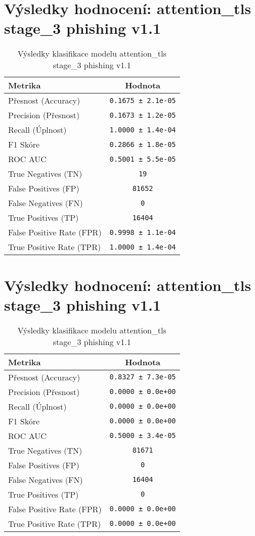 \section*{Výsledky hodnocení: attention_tls stage_3 phishing v1.1}
\begin{table}[h!]
\centering
\begin{tabular}{|l|c|}
\hline
\textbf{Metrika} & \textbf{Hodnota} \\
\hline
Přesnost (Accuracy) & \texttt{0.1675 ± 2.1e-05} \\
Precision (Přesnost) & \texttt{0.1673 ± 1.2e-05} \\
Recall (Úplnost) & \texttt{1.0000 ± 1.4e-04} \\
F1 Skóre & \texttt{0.2866 ± 1.8e-05} \\
ROC AUC & \texttt{0.5001 ± 5.5e-05} \\
True Negatives (TN) & \texttt{19} \\
False Positives (FP) & \texttt{81652} \\
False Negatives (FN) & \texttt{0} \\
True Positives (TP) & \texttt{16404} \\
False Positive Rate (FPR) & \texttt{0.9998 ± 1.1e-04} \\
True Positive Rate (TPR) & \texttt{1.0000 ± 1.4e-04} \\
\hline
\end{tabular}
\caption{Výsledky klasifikace modelu attention_tls stage_3 phishing v1.1}
\label{tab:phishing_attention_tls}
\end{table}

\section*{Výsledky hodnocení: attention_tls stage_3 phishing v1.1}
\begin{table}[h!]
\centering
\begin{tabular}{|l|c|}
\hline
\textbf{Metrika} & \textbf{Hodnota} \\
\hline
Přesnost (Accuracy) & \texttt{0.8327 ± 7.3e-05} \\
Precision (Přesnost) & \texttt{0.0000 ± 0.0e+00} \\
Recall (Úplnost) & \texttt{0.0000 ± 0.0e+00} \\
F1 Skóre & \texttt{0.0000 ± 0.0e+00} \\
ROC AUC & \texttt{0.5000 ± 3.4e-05} \\
True Negatives (TN) & \texttt{81671} \\
False Positives (FP) & \texttt{0} \\
False Negatives (FN) & \texttt{16404} \\
True Positives (TP) & \texttt{0} \\
False Positive Rate (FPR) & \texttt{0.0000 ± 0.0e+00} \\
True Positive Rate (TPR) & \texttt{0.0000 ± 0.0e+00} \\
\hline
\end{tabular}
\caption{Výsledky klasifikace modelu attention_tls stage_3 phishing v1.1}
\label{tab:phishing_attention_tls}
\end{table}

